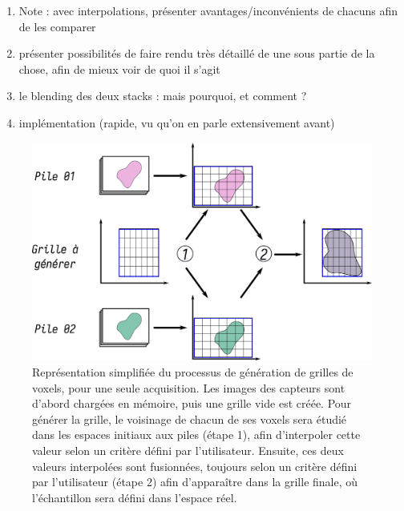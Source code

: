 {{\begin{enumerate}
\begin{enumerate}
\begin{itemize}
					\item l'interpolation nearest neighbor : tout bête
					\item l'interpolation trilinéaire : c'est un petit peu mieux, permet d'estimer un blending des valeurs aux points pour mieux estimer la donnée
					\item l'interpolation barycentrique : meme effet que 3-lin., et en + : résiste au changement d'espace car espace défini par position des points du tétraèdre
				\end{itemize}
				\item Note : avec interpolations, présenter avantages/inconvénients de chacuns afin de les comparer
				\item présenter possibilités de faire rendu très détaillé de une sous partie de la chose, afin de mieux voir de quoi il s'agit
				\item le blending des deux stacks : mais pourquoi, et comment ?
				\item implémentation (rapide, vu qu'on en parle extensivement avant)
			\end{enumerate}
		\end{enumerate}
	}
	\fi
	
    \begin{figure}[h]
        \centering
        \includegraphics[width=.8\linewidth]{img/pipeline_whole.png}
        \captionsetup{width=.85\linewidth}
        \caption{Représentation simplifiée du processus de génération de grilles de voxels, pour une seule acquisition. Les images des capteurs sont d'abord chargées en mémoire, puis une grille vide est créée. Pour générer la grille, le voisinage de chacun de ses voxels sera étudié dans les espaces initiaux aux piles (étape 1), afin d'interpoler cette valeur selon un critère défini par l'utilisateur. Ensuite, ces deux valeurs interpolées sont fusionnées, toujours selon un critère défini par l'utilisateur (étape 2) afin d'apparaître dans la grille finale, où l'échantillon sera défini dans l'espace réel.}%
        \label{img:reconstruction_pipeline}
    \end{figure}
	
}
